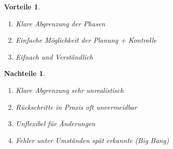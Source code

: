 \documentclass[a4paper]{article}
\theoremstyle{break}
\newtheorem{why}{Vorteile}[section]
\newtheorem{whynot}{Nachteile}[section]
\begin{document}
\begin {why}
  \begin {enumerate}
    \item Klare Abgrenzung der Phasen
    \item Einfache Möglichkeit der Planung + Kontrolle
      \item Eifnach und Verständlich
  \end {enumerate}
  
\end {why}
\begin {whynot}
  \begin {enumerate}
  \item Klare Abgrenzung sehr unrealistisch
  \item Rückschritte in Praxis oft unvermeidbar
  \item Unflexibel für Änderungen
    \item Fehler unter Umständen spät erkannte (Big Bang)
  \end {enumerate}
\end {whynot}
\end{document}
